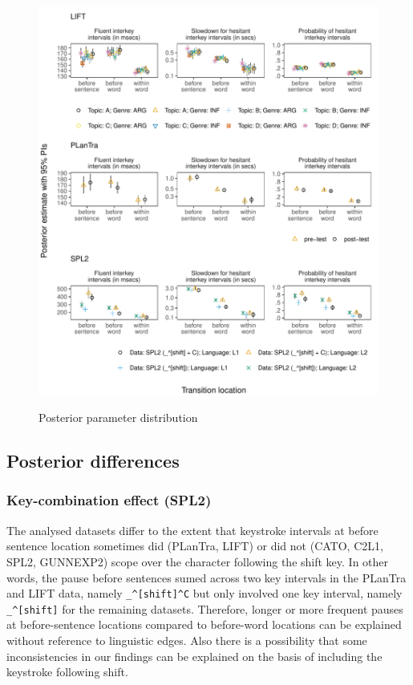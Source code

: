 \begin{appendix}
\begin{figure}[!htb]
\includegraphics{figures/psplots2.pdf}
\label{fig:fullps1}
\caption{Posterior parameter distribution}
\end{figure}

\hypertarget{posterior-differences}{%
\subsection{Posterior differences}\label{posterior-differences}}

\hypertarget{key-combination-effect-spl2}{%
\subsubsection{Key-combination effect
(SPL2)}\label{key-combination-effect-spl2}}

The analysed datasets differ to the extent that keystroke intervals at
before sentence location sometimes did (PLanTra, LIFT) or did not (CATO,
C2L1, SPL2, GUNNEXP2) scope over the character following the shift key.
In other words, the pause before sentences sumed across two key
intervals in the PLanTra and LIFT data, namely
\texttt{\_\^{}{[}shift{]}\^{}C} but only involved one key interval,
namely \texttt{\_\^{}{[}shift{]}} for the remaining datasets. Therefore,
longer or more frequent pauses at before-sentence locations compared to
before-word locations can be explained without reference to linguistic
edges. Also there is a possibility that some inconsistencies in our
findings can be explained on the basis of including the keystroke
following shift.


\end{appendix}
